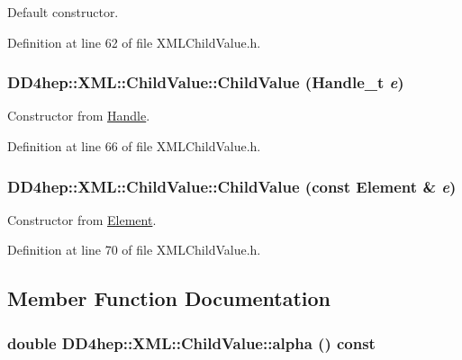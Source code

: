 Default constructor. 

Definition at line 62 of file XMLChildValue.h.\hypertarget{struct_d_d4hep_1_1_x_m_l_1_1_child_value_af223fea6d4d6b08ac0cb655f22e8e2b0}{
\subsubsection[{ChildValue}]{\setlength{\rightskip}{0pt plus 5cm}DD4hep::XML::ChildValue::ChildValue ({\bf Handle\_\-t} {\em e})}}
\label{struct_d_d4hep_1_1_x_m_l_1_1_child_value_af223fea6d4d6b08ac0cb655f22e8e2b0}


Constructor from \hyperlink{class_d_d4hep_1_1_handle}{Handle}. 

Definition at line 66 of file XMLChildValue.h.\hypertarget{struct_d_d4hep_1_1_x_m_l_1_1_child_value_a1295821eee0759c3d9617408b40aedac}{
\subsubsection[{ChildValue}]{\setlength{\rightskip}{0pt plus 5cm}DD4hep::XML::ChildValue::ChildValue (const {\bf Element} \& {\em e})}}
\label{struct_d_d4hep_1_1_x_m_l_1_1_child_value_a1295821eee0759c3d9617408b40aedac}


Constructor from \hyperlink{class_d_d4hep_1_1_x_m_l_1_1_element}{Element}. 

Definition at line 70 of file XMLChildValue.h.

\subsection{Member Function Documentation}
\hypertarget{struct_d_d4hep_1_1_x_m_l_1_1_child_value_a13ea11fa759ac9c06e68dc57b8bcbaf9}{
\subsubsection[{alpha}]{\setlength{\rightskip}{0pt plus 5cm}double DD4hep::XML::ChildValue::alpha () const}}
\label{struct_d_d4hep_1_1_x_m_l_1_1_child_value_a13ea11fa759ac9c06e68dc57b8bcbaf9}


